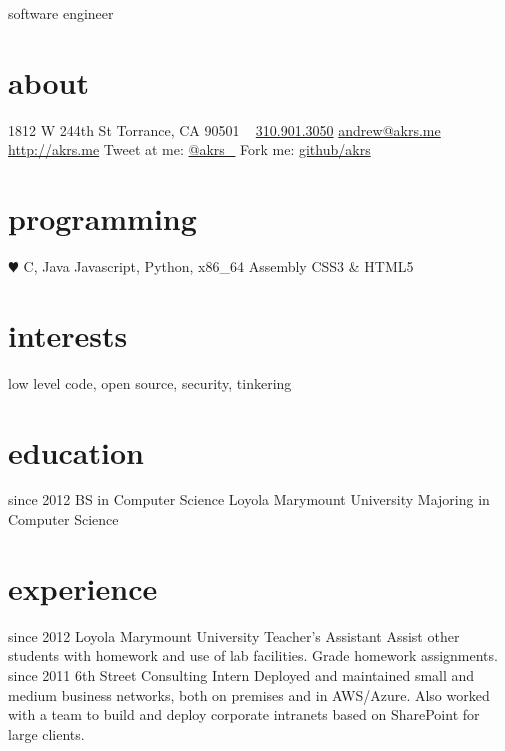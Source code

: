 \documentclass[]{akers-cv}
\begin{document}
       {software engineer}


\begin{aside}
  \section{about}
    1812 W 244th St
    Torrance, CA 90501
    ~
    \href{tel:13109013050}{310.901.3050}
    \href{mailto:andrew@akrs.me}{andrew@akrs.me}
    \href{http://akrs.me}{http://akrs.me}
    Tweet at me: \href{http://twitter.com/akrs_}{@akrs\_}
    Fork me: \href{http://github.com/akrs}{github/akrs}
  \section{programming}
    {\color{red} $\varheartsuit$} C, Java
    Javascript, Python, x86\_64 Assembly
    CSS3 \& HTML5
\end{aside}

\section{interests}

low level code, open source, security, tinkering

\section{education}

\begin{entrylist}
  \entry
    {since 2012}
    {BS in Computer Science}
    {Loyola Marymount University}
    {Majoring in Computer Science}
\end{entrylist}

\section{experience}

\begin{entrylist}
  \entry
    {since 2012}
    {Loyola Marymount University}
    {Teacher's Assistant}
    {Assist other students with homework and use of lab facilities. Grade homework assignments.}
  \entry
    {since 2011}
    {6th Street Consulting}
    {Intern}
    {Deployed and maintained small and medium business networks, both on premises and in AWS/Azure. Also worked with a team to build and deploy corporate intranets based on SharePoint for large clients.}
\end{entrylist}
\end{document}
